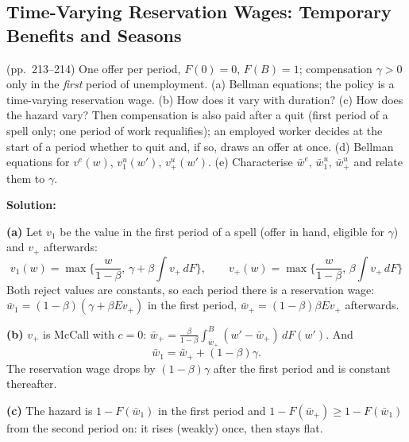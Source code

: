 \documentclass[12pt, letterpaper]{article}
\newcommand{\wb}{\bar w}
\newcommand{\Gint}[1]{\int_{#1}^{B}(w'-#1)\,dF(w')}
\begin{document}
\subsection{Time-Varying Reservation Wages: Temporary Benefits and Seasons}

\begin{tcolorbox}[evenbox,title={Exercise 6.14 \quad Temporary Unemployment Compensation}]
\begin{tcolorbox}[questionbox]
(pp.~213--214) One offer per period, $F(0)=0$, $F(B)=1$; compensation $\gamma>0$ only in the \emph{first}
period of unemployment. (a) Bellman equations; the policy is a time-varying reservation wage. (b) How
does it vary with duration? (c) How does the hazard vary? Then compensation is also paid after a quit
(first period of a spell only; one period of work requalifies); an employed worker decides at the start
of a period whether to quit and, if so, draws an offer at once. (d) Bellman equations for $v^e(w)$,
$v^u_1(w')$, $v^u_+(w')$. (e) Characterise $\wb^e$, $\wb^u_1$, $\wb^u_+$ and relate them to $\gamma$.
\end{tcolorbox}

\textbf{Solution:}

\textbf{(a)} Let $v_1$ be the value in the first period of a spell (offer in hand, eligible for $\gamma$) and
$v_+$ afterwards:
\[
\boxed{v_1(w)=\max\Big\{\frac{w}{1-\beta},\,\gamma+\beta\int v_+\,dF\Big\},\qquad
v_+(w)=\max\Big\{\frac{w}{1-\beta},\,\beta\int v_+\,dF\Big\}}
\]
Both reject values are constants, so each period there is a reservation wage: $\wb_1=(1-\beta)(\gamma+\beta Ev_+)$
in the first period, $\wb_+=(1-\beta)\beta Ev_+$ afterwards.

\textbf{(b)} $v_+$ is McCall with $c=0$: $\wb_+=\frac{\beta}{1-\beta}\Gint{\wb_+}$. And
\[
\wb_1=\wb_++(1-\beta)\gamma .
\]
The reservation wage drops by $(1-\beta)\gamma$ after the first period and is constant thereafter.

\textbf{(c)} The hazard is $1-F(\wb_1)$ in the first period and $1-F(\wb_+)\ge1-F(\wb_1)$ from the second
period on: it rises (weakly) once, then stays flat.


\end{tcolorbox}
\end{document}
